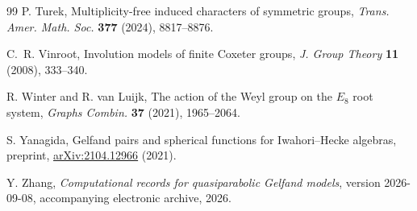 \documentclass[11pt]{article}
\numberwithin{equation}{section}
\theoremstyle{definition}
\begin{document}
\begin{thebibliography}{99}
P. Turek,
Multiplicity-free induced characters of symmetric groups,
\emph{Trans. Amer. Math. Soc.} \textbf{377} (2024), 8817--8876.

C.~R. Vinroot,
Involution models of finite Coxeter groups,
\emph{J. Group Theory} \textbf{11} (2008), 333--340.

R. Winter and R. van Luijk,
The action of the Weyl group on the \(E_8\) root system,
\emph{Graphs Combin.} \textbf{37} (2021), 1965--2064.

S. Yanagida,
Gelfand pairs and spherical functions for Iwahori--Hecke algebras,
preprint, \href{https://arxiv.org/abs/2104.12966}{arXiv:2104.12966} (2021).

Y. Zhang,
\emph{Computational records for quasiparabolic Gelfand models},
version 2026-09-08, accompanying electronic archive, 2026.

\end{thebibliography}
\end{document}
